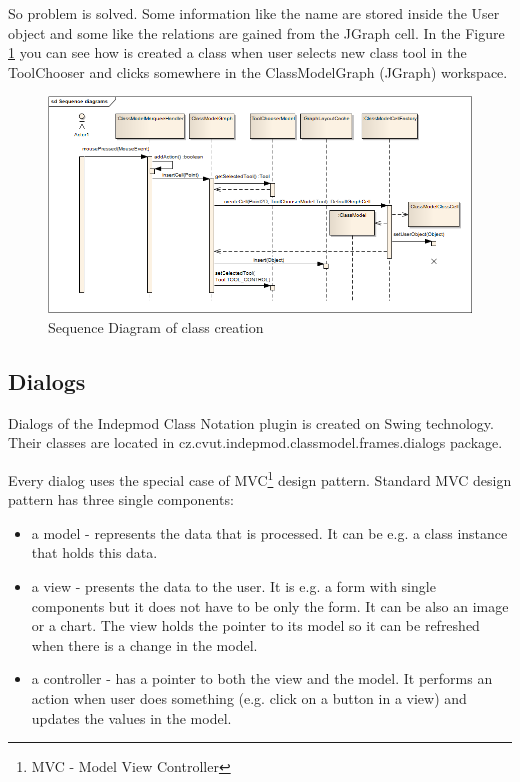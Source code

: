 So problem is solved. Some information like the name are stored inside the User object and some like the relations are gained from the JGraph cell. In the Figure \ref{f-ClassCreationSequenceDiagram} you can see how is created a class when user selects new class tool in the ToolChooser and clicks somewhere in the ClassModelGraph (JGraph) workspace.

\begin{figure}[!ht]
\begin{center}
\includegraphics[width=\textwidth]{img/ClassCreationSequenceDiagram.png}
\caption{Sequence Diagram of class creation}
\label{f-ClassCreationSequenceDiagram}
\end{center}
\end{figure}

\subsection{Dialogs}

Dialogs of the Indepmod Class Notation plugin is created on Swing technology. Their classes are located in cz.cvut.indepmod.classmodel.frames.dialogs package.

Every dialog uses the special case of MVC\footnote{MVC - Model View Controller} design pattern. Standard MVC design pattern has three single components:
 \begin{itemize}
    \item a model - represents the data that is processed. It can be e.g. a class instance that holds this data.
    \item a view - presents the data to the user. It is e.g. a form with single components but it does not have to be only the form. It can be also an image or a chart. The view holds the pointer to its model so it can be refreshed when there is a change in the model.
    \item a controller - has a pointer to both the view and the model. It performs an action when user does something (e.g. click on a button in a view) and updates the values in the model.
\end{itemize}

